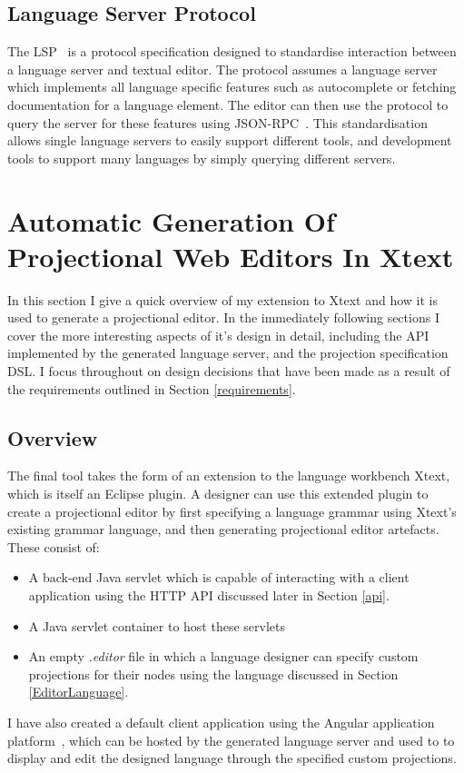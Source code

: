 \documentclass{article}
\begin{document}
\subsection{Language Server Protocol}\label{lsp}
The LSP~\cite{lsp} is a protocol specification designed to standardise interaction between a language server and textual editor. The protocol assumes a language server which implements all language specific features such as autocomplete or fetching documentation for a language element. The editor can then use the protocol to query the server for these features using JSON-RPC~\cite{jsonrpc}. This standardisation allows single language servers to easily support different tools, and development tools to support many languages by simply querying different servers.
%
%
%
%
%
%
%
\section{Automatic Generation Of Projectional Web Editors In Xtext}\label{generation}
In this section I give a quick overview of my extension to Xtext and how it is used to generate a projectional editor. In the immediately following sections I cover the more interesting aspects of it's design in detail, including the API implemented by the generated language server, and the projection specification DSL. I focus throughout on design decisions that have been made as a result of the requirements outlined in Section \ref{requirements}. 


\subsection{Overview}

The final tool takes the form of an extension to the language workbench Xtext, which is itself an Eclipse plugin. A designer can use this extended plugin to create a projectional editor by first specifying a language grammar using Xtext's existing grammar language, and then generating projectional editor artefacts. These consist of:
\begin{itemize}
\item A back-end Java servlet which is capable of interacting with a client application using the HTTP API discussed later in Section \ref{api}.
\item A Java servlet container to host these servlets
\item An empty \emph{.editor} file in which a language designer can specify custom projections for their nodes using the language discussed in Section \ref{EditorLanguage}. 
\end{itemize}
%
I have also created a default client application using the Angular application platform~\cite{angular}, which can be hosted by the generated language server and used to to display and edit the designed language through the specified custom projections. 
\end{document}
